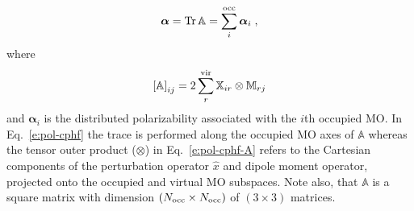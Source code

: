 \documentclass[aip,graphicx]{revtex4-1}
\newcommand{\BM}[1]{\bm{#1}}
\DeclareMathOperator{\Tr}{Tr}
\begin{document}
%
\begin{equation} \label{e:pol-cphf}
 {\BM{\alpha}} = \Tr{{\mathbb{A}}} = \sum_i^{\rm occ} {\BM{\alpha}}_i  \;,
\end{equation}
%
where
%
\begin{equation} \label{e:pol-cphf-A}
 \left[{\mathbb{A}}\right]_{ij} = 2 \sum_r^{\rm vir} {\mathbb X}_{ir} \otimes {\mathbb{M}}_{rj}
\end{equation}
%
and ${\BM{\alpha}}_i$ is the distributed polarizability associated with the $i$th occupied MO.
In Eq.~\eqref{e:pol-cphf} the trace is performed along the occupied MO axes of ${\mathbb{A}}$
whereas the tensor outer product ($\otimes$) in Eq.~\eqref{e:pol-cphf-A} refers to the Cartesian components of
the perturbation operator $\hat{x}$ and dipole moment operator, projected onto the 
occupied and virtual MO subspaces. Note also, that ${\mathbb{A}}$ is a square matrix with
dimension $(N_{\rm occ} \times N_{\rm occ})$ of $(3 \times 3)$ matrices.
\end{document}
